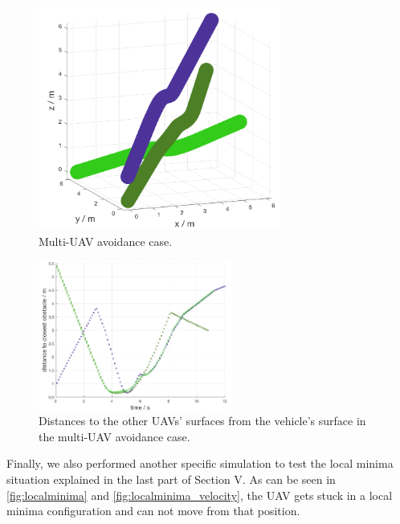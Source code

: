 \documentclass[journal, twoside]{IEEEtran}
\begin{document}
		\begin{figure}[h]
			\centering
			\includegraphics[width=8cm]{Results/Potentialfields/multi_uav_avoidance}
			\caption{Multi-UAV avoidance case.}
			\label{fig:multi_uav_avoidance}
		\end{figure}
	
		\begin{figure}[h]
			\centering
			\includegraphics[width=2.5in]{Results/Potentialfields/multi_uav_avoidance_obstacle}
			\caption{Distances to the other UAVs' surfaces from the vehicle's surface in the multi-UAV avoidance case.}
			\label{fig:multi_uav_avoidance_distance}
		\end{figure}
	
		Finally, we also performed another specific simulation to test the local minima situation explained in the last part of Section V. As can be seen in \figurename{ \ref{fig:localminima}} and \figurename{ \ref{fig:localminima_velocity}}, the UAV gets stuck in a local minima configuration and can not move from that position. 
		
\end{document}
